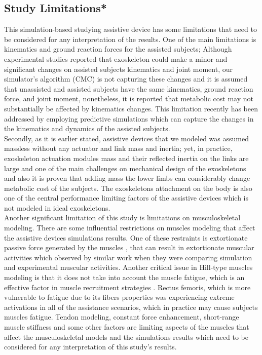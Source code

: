 \documentclass[10pt,letterpaper]{article}
\begin{document}
\subsection*{Study Limitations*}
This simulation-based studying assistive device has some limitations that need to be considered for any interpretation of the results. One of the main limitations is kinematics and ground reaction forces for the assisted subjects; Although experimental studies reported that exoskeleton could make a minor \cite{42,79,91,114,115,116} and significant \cite{80,117,118,119} changes on assisted subjects kinematics and joint moment, our simulator's algorithm (CMC) is not capturing these changes and it is assumed that unassisted and assisted subjects have the same kinematics, ground reaction force, and joint moment, nonetheless, it is reported that metabolic cost may not substantially be affected by kinematics changes\cite{120}. This limitation recently has been addressed by employing predictive simulations which can capture the changes in the kinematics and dynamics of the assisted subjects.\\  
Secondly, as it is earlier stated, assistive devices that we modeled was assumed massless without any actuator and link mass and inertia; yet, in practice, exoskeleton actuation modules mass and their reflected inertia on the links are large and one of the main challenges on mechanical design of the exoskeletons and also it is proven that adding mass the lower limbs can considerably change metabolic cost of the subjects. The exoskeletons attachment on the body is also one of the central performance limiting factors of the assistive devices \cite{121} which is not modeled in ideal exoskeletons.\\
Another significant limitation of this study is limitations on musculoskeletal modeling. There are some influential restrictions on muscles modeling that affect the assistive devices simulations results. One of these restraints is extortionate passive force generated by the muscles \cite{92}, that can result in extortionate muscular activities which observed by similar work \cite{93} when they were comparing simulation and experimental muscular activities. Another critical issue in Hill-type muscles modeling is that it does not take into account the muscle fatigue, which is an effective factor in muscle recruitment strategies \cite{92}. Rectus femoris, which is more vulnerable to fatigue due to its fibers properties \cite{123} was experiencing extreme activations in all of the assistance scenarios, which in practice may cause subjects muscles fatigue\cite{122}. Tendon modeling, constant force enhancement, short-range muscle stiffness and some other factors \cite{92} are limiting aspects of the muscles that affect the musculoskeletal models and the simulations results which need to be considered for any interpretation of this study's results.\\
\end{document}
